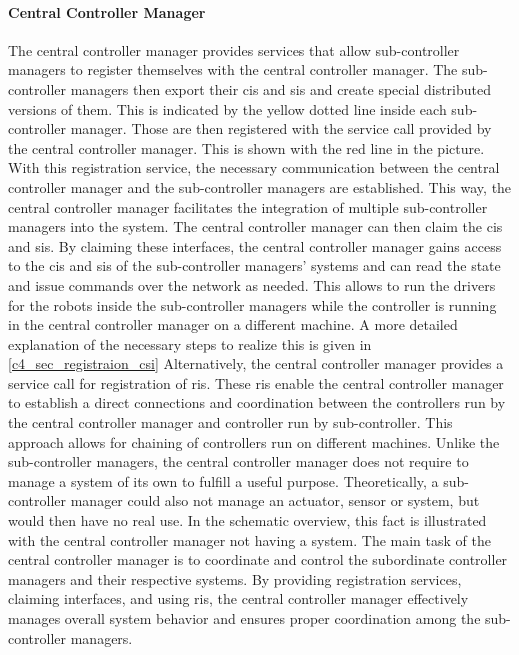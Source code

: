 \paragraph{Central Controller Manager}
The central controller manager provides services that allow sub-controller managers to register themselves with the central controller manager. The sub-controller managers then export their \glspl{ci} and \glspl{si} and create special distributed versions of them. This is indicated by the yellow dotted line inside each sub-controller manager. Those are then registered with the service call provided by the central controller manager. This is shown with the red line in the picture. With this registration service, the necessary communication between the central controller manager and the sub-controller managers are established. This way, the central controller manager facilitates the integration of multiple sub-controller managers into the system.\newline
The central controller manager can then claim the \glspl{ci} and \glspl{si}. By claiming these interfaces, the central controller manager gains access to the \glspl{ci} and \glspl{si} of the sub-controller managers' systems and can read the state and issue commands over the network as needed. This allows to run the drivers for the robots inside the sub-controller managers while the controller is running in the central controller manager on a different machine. A more detailed explanation of the necessary steps to realize this is given in  \autoref{c4_sec_registraion_csi}\newline
Alternatively, the central controller manager provides a service call for registration of \glspl{ri}. These \glspl{ri} enable the central controller manager to establish a direct connections and coordination between the controllers run by the central controller manager and controller run by sub-controller. This approach allows for chaining of controllers run on different machines.\newline
Unlike the sub-controller managers, the central controller manager does not require to manage a system of its own to fulfill a useful purpose. Theoretically, a sub-controller manager could also not manage an actuator, sensor or system, but would then have no real use. In the schematic overview, this fact is illustrated with the central controller manager not having a system. The main task of the central controller manager is to coordinate and control the subordinate controller managers and their respective systems. By providing registration services, claiming interfaces, and using \glspl{ri}, the central controller manager effectively manages overall system behavior and ensures proper coordination among the sub-controller managers.
